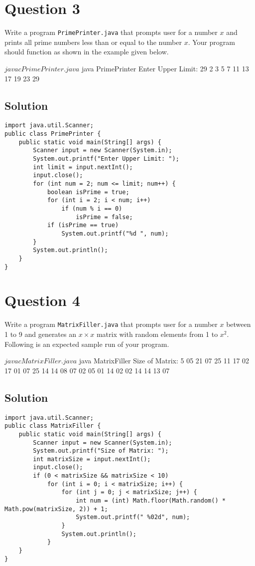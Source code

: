 \section*{Question 3}
Write a program \texttt{PrimePrinter.java} that prompts user for a number $x$ and prints all prime numbers less than or equal to the number $x$.
Your program should function as shown in the example given below.

\begin{terminal}
$ javac PrimePrinter.java
$ java PrimePrinter
Enter Upper Limit: 29
2 3 5 7 11 13 17 19 23 29
\end{terminal}

\subsection*{Solution}
\lstset{language=Java,tabsize=2}
\begin{lstlisting}
import java.util.Scanner;
public class PrimePrinter {
	public static void main(String[] args) {
		Scanner input = new Scanner(System.in);
		System.out.printf("Enter Upper Limit: ");
		int limit = input.nextInt();
		input.close();
		for (int num = 2; num <= limit; num++) {
			boolean isPrime = true;
			for (int i = 2; i < num; i++)
				if (num % i == 0)
					isPrime = false;
			if (isPrime == true)
				System.out.printf("%d ", num);
		}
		System.out.println();
	}
}
\end{lstlisting}

\section*{Question 4}
Write a program \texttt{MatrixFiller.java} that prompts user for a number $x$ between 1 to 9 and generates an $x \times x$ matrix with random elements from 1 to $x^2$.
Following is an expected sample run of your program.

\begin{terminal}
$ javac MatrixFiller.java
$ java MatrixFiller
Size of Matrix: 5
 05 21 07 25 11
 17 02 17 01 07
 25 14 14 08 07
 02 05 01 14 02
 02 14 14 13 07
\end{terminal}

\subsection*{Solution}
\lstset{language=Java,tabsize=2}
\begin{lstlisting}
import java.util.Scanner;
public class MatrixFiller {
	public static void main(String[] args) {
		Scanner input = new Scanner(System.in);
		System.out.printf("Size of Matrix: ");
		int matrixSize = input.nextInt();
		input.close();
		if (0 < matrixSize && matrixSize < 10)
			for (int i = 0; i < matrixSize; i++) {
				for (int j = 0; j < matrixSize; j++) {
					int num = (int) Math.floor(Math.random() * Math.pow(matrixSize, 2)) + 1;
					System.out.printf(" %02d", num);
				}
				System.out.println();
			}
	}
}
\end{lstlisting}

